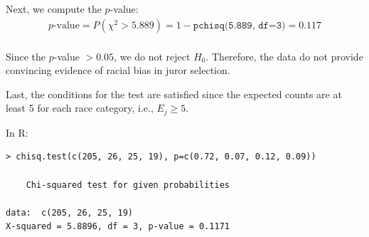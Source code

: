 \documentclass[10pt]{beamer}
\begin{document}
\begin{frame}
Next, we compute the $p$-value:
\begin{align*}
\text{$p$-value} = P(\chi^2 > 5.889) = 1 - \texttt{pchisq(5.889, df=3)} = 0.117\\ 
\end{align*}

Since the $p$-value $>0.05$, we do not reject $H_0$.  Therefore, the data do not provide convincing evidence of racial bias in juror selection.\\  
\vspace{10pt}

Last, the conditions for the test are satisfied since the expected counts are at least 5 for each race category, i.e., $E_j \geq 5$.\\
\end{frame}

\begin{frame}[fragile]
In R:
\begin{verbatim}
> chisq.test(c(205, 26, 25, 19), p=c(0.72, 0.07, 0.12, 0.09))

	Chi-squared test for given probabilities

data:  c(205, 26, 25, 19)
X-squared = 5.8896, df = 3, p-value = 0.1171
\end{verbatim}
\end{frame}
\end{document}
